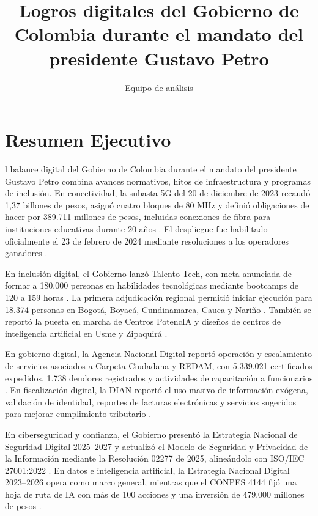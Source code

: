\documentclass[9pt,a4paper,twoside]{rho-class/rho}
\title{Logros digitales del Gobierno de Colombia durante el mandato del presidente Gustavo Petro}
\author[{\textasteriskcentered},a,1]{Equipo de análisis}
\affil[a]{Documento de trabajo}
\begin{document}
\maketitle
\thispagestyle{firststyle}

\section{Resumen Ejecutivo}

l balance digital del Gobierno de Colombia durante el mandato del presidente Gustavo Petro combina avances normativos, hitos de infraestructura y programas de inclusión. En conectividad, la subasta 5G del 20 de diciembre de 2023 recaudó 1,37 billones de pesos, asignó cuatro bloques de 80 MHz y definió obligaciones de hacer por 389.711 millones de pesos, incluidas conexiones de fibra para instituciones educativas durante 20 años \cite{mintic_5g_realidad_2023}. El despliegue fue habilitado oficialmente el 23 de febrero de 2024 mediante resoluciones a los operadores ganadores \cite{mintic_despliegue_5g_2024}.

En inclusión digital, el Gobierno lanzó Talento Tech, con meta anunciada de formar a 180.000 personas en habilidades tecnológicas mediante bootcamps de 120 a 159 horas \cite{mintic_talento_tech_lanzamiento_2023}. La primera adjudicación regional permitió iniciar ejecución para 18.374 personas en Bogotá, Boyacá, Cundinamarca, Cauca y Nariño \cite{mintic_talento_tech_regiones_2023}. También se reportó la puesta en marcha de Centros PotencIA y diseños de centros de inteligencia artificial en Usme y Zipaquirá \cite{mintic_rendicion_cuentas_2024,mintic_centros_potencia_2025}.

En gobierno digital, la Agencia Nacional Digital reportó operación y escalamiento de servicios asociados a Carpeta Ciudadana y REDAM, con 5.339.021 certificados expedidos, 1.738 deudores registrados y actividades de capacitación a funcionarios \cite{and_informe_gestion_2024}. En fiscalización digital, la DIAN reportó el uso masivo de información exógena, validación de identidad, reportes de facturas electrónicas y servicios sugeridos para mejorar cumplimiento tributario \cite{dian_informe_gestion_2025,dian_cifras_sfe_2026}.

En ciberseguridad y confianza, el Gobierno presentó la Estrategia Nacional de Seguridad Digital 2025--2027 y actualizó el Modelo de Seguridad y Privacidad de la Información mediante la Resolución 02277 de 2025, alineándolo con ISO/IEC 27001:2022 \cite{mintic_seguridad_digital_2025,mintic_mspi_resolucion_02277_2025}. En datos e inteligencia artificial, la Estrategia Nacional Digital 2023--2026 opera como marco general, mientras que el CONPES 4144 fijó una hoja de ruta de IA con más de 100 acciones y una inversión de 479.000 millones de pesos \cite{mintic_estrategia_nacional_digital_2023,vanegas_conpes_4144_2025}.
\end{document}
